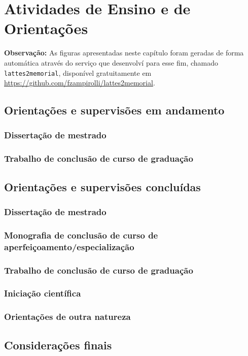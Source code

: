 

\chapter{Atividades de Ensino e de Orientações}\label{cap:ensino}

\noindent
\textbf{Observação:} As figuras apresentadas neste capítulo foram geradas de forma automática através do serviço que desenvolví para esse fim, chamado \texttt{lattes2memorial}, disponível gratuitamente em \url{https://github.com/fzampirolli/lattes2memorial}.

\section{Orientações e supervisões em andamento}

\subsection{Dissertação de mestrado}



\subsection{Trabalho de conclusão de curso de graduação}



\section{Orientações e supervisões concluídas}

\subsection{Dissertação de mestrado}



\subsection{Monografia de conclusão de curso de aperfeiçoamento/especialização}



\subsection{Trabalho de conclusão de curso de graduação}



\subsection{Iniciação científica}



\subsection{Orientações de outra natureza}



\section{Considerações finais}
